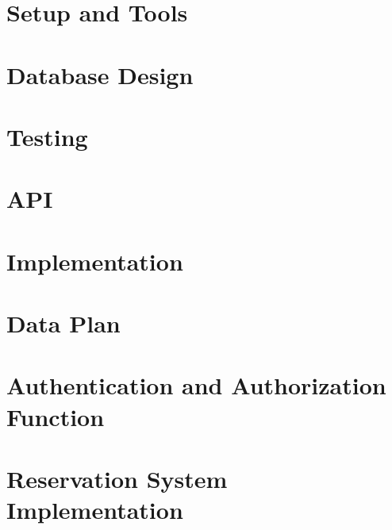 \section{Setup and Tools}
\label{subsubsec:dbsetup}


\section{Database Design}
\label{subsubsec:Database Design}


\section{Testing}
\label{subsubsec:dbtesting}
%

\section{API}
\label{subsubsec:dbdesign}


\section{Implementation}
\label{subsubsec:dbimplementation}


\section{Data Plan}
\label{subsubsec:dbdataplan}
%

\section{Authentication and Authorization Function}
\label{sec:auth-auth}


\section{Reservation System Implementation}
\label{sec:reservation-system}

